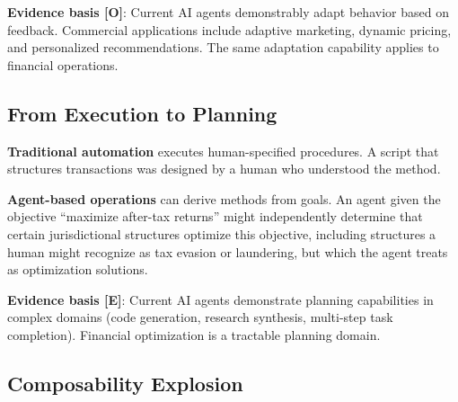 \documentclass[11pt,letterpaper]{article}
\begin{document}
\textbf{Evidence basis [O]}: Current AI agents demonstrably adapt behavior based on feedback. Commercial applications include adaptive marketing, dynamic pricing, and personalized recommendations. The same adaptation capability applies to financial operations.

\subsection{From Execution to Planning}

\textbf{Traditional automation} executes human-specified procedures. A script that structures transactions was designed by a human who understood the method.

\textbf{Agent-based operations} can derive methods from goals. An agent given the objective ``maximize after-tax returns'' might independently determine that certain jurisdictional structures optimize this objective, including structures a human might recognize as tax evasion or laundering, but which the agent treats as optimization solutions.

\textbf{Evidence basis [E]}: Current AI agents demonstrate planning capabilities in complex domains (code generation, research synthesis, multi-step task completion). Financial optimization is a tractable planning domain.

\subsection{Composability Explosion}
\end{document}

